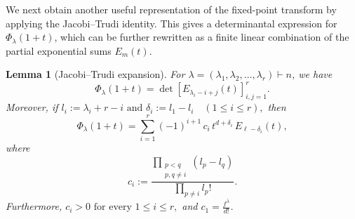 \documentclass[12pt]{article}
\newtheorem{lemma}{Lemma}[section]
\theoremstyle{definition}
\newcommand{\1}{\mathbf 1}
\begin{document}
We next obtain another useful representation of the fixed-point transform by applying the Jacobi--Trudi identity. This gives a determinantal expression for $\Phi_\lambda(1+t)$, which can be further rewritten as a finite linear combination of the partial exponential sums $E_m(t)$. 


\begin{lemma}[Jacobi--Trudi expansion]\label{lem:Jacobu-Trudi}
For $\lambda=(\lambda_1,\lambda_2,\dots,\lambda_r)\vdash n$, we have
\begin{equation*}
\Phi_\lambda(1+t)
=
\det\left[
E_{\lambda_i-i+j}(t)
\right]_{i,j=1}^{r}.
\end{equation*}
Moreover, if $l_i:=\lambda_i+r-i
\text{ and }
\delta_i:=l_1-l_i
\quad (1\leq i\leq r),
$ then
\begin{equation*}
\Phi_\lambda(1+t)
=
\sum_{i=1}^{r}
(-1)^{i+1}\,c_i\,
t^{d+\delta_i}\,
E_{\ell-\delta_i}(t),
\end{equation*}
where
\begin{equation*}
c_i:=
\frac{
\displaystyle
\prod_{\substack{p<q\\p,q\neq i}}
(l_p-l_q)
}{
\displaystyle
\prod_{p\neq i}l_p!
}.
\end{equation*}
Furthermore, $
c_i>0
\text{ for every }1\leq i\leq r,
$ and $c_1=\frac{f^{\overline{\lambda}}}{d!}$.
\end{lemma}
\end{document}
